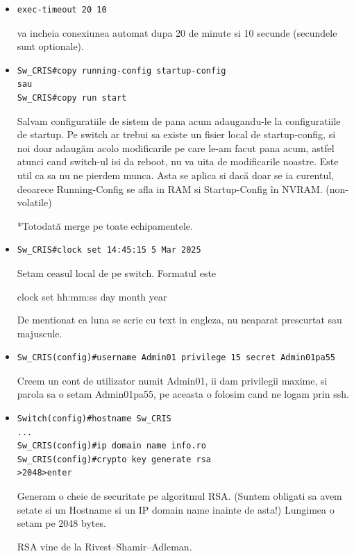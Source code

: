 \documentclass{article}
\begin{document}
\begin{itemize}
\item
\begin{verbatim}
exec-timeout 20 10
\end{verbatim} va incheia conexiunea automat dupa 20 de minute si 10 secunde (secundele sunt optionale).

\item 
\begin{verbatim}
Sw_CRIS#copy running-config startup-config
sau
Sw_CRIS#copy run start
\end{verbatim}
Salvam configuratiile de sistem de pana acum adaugandu-le la configuratiile de startup. Pe switch ar trebui sa existe un fisier local de startup-config, si noi doar adaugăm acolo modificarile pe care le-am facut pana acum, astfel atunci cand switch-ul isi da reboot, nu va uita de modificarile noastre. Este util ca sa nu ne pierdem munca. Asta se aplica si dacă doar se ia curentul, deoarece Running-Config se afla in RAM si Startup-Config în NVRAM. (non-volatile)

*Totodată merge pe toate echipamentele.

\item 
\begin{verbatim}
Sw_CRIS#clock set 14:45:15 5 Mar 2025
\end{verbatim}
Setam ceasul local de pe switch. 
Formatul este 

clock set hh:mm:ss day month year

De mentionat ca luna se scrie cu text in engleza, nu neaparat prescurtat sau majuscule.

\item 
\begin{verbatim}
Sw_CRIS(config)#username Admin01 privilege 15 secret Admin01pa55
\end{verbatim} 
Creem un cont de utilizator numit Admin01, ii dam privilegii maxime, si parola sa o setam Admin01pa55, pe aceasta o folosim cand ne logam prin ssh.

\item 
\begin{verbatim}
Switch(config)#hostname Sw_CRIS
...
Sw_CRIS(config)#ip domain name info.ro
Sw_CRIS(config)#crypto key generate rsa
>2048>enter
\end{verbatim} 
Generam o cheie de securitate pe algoritmul RSA. (Suntem obligati sa avem setate si un Hostname si un IP domain name inainte de asta!) Lungimea o setam pe 2048 bytes.

RSA vine de la Rivest–Shamir–Adleman.


\end{itemize}
\end{document}
